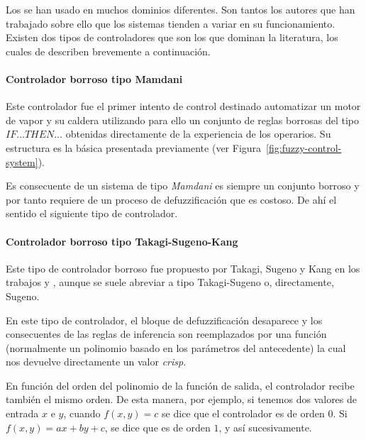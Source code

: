 Los  se han usado en muchos dominios diferentes. Son tantos los autores que han trabajado sobre ello que los sistemas tienden a variar en su funcionamiento. Existen dos tipos de controladores que son los que dominan la literatura, los cuales de describen brevemente a continuación.

\paragraph{Controlador borroso tipo Mamdani}

Este controlador fue el primer intento de control destinado automatizar un motor de vapor y su caldera utilizando para ello un conjunto de reglas borrosas del tipo \texttt{$IF \ldots THEN \ldots$} obtenidas directamente de la experiencia de los operarios. Su estructura es la básica presentada previamente (ver Figura~\ref{fig:fuzzy-control-system}).

Es consecuente de un sistema de tipo \textit{Mamdani} es siempre un conjunto borroso y por tanto requiere de un proceso de defuzzificación que es costoso. De ahí el sentido el siguiente tipo de controlador.

\paragraph{Controlador borroso tipo Takagi-Sugeno-Kang}

Este tipo de controlador borroso fue propuesto por Takagi, Sugeno y Kang en los trabajos \cite{takagi1993fuzzy} y \cite{sugeno1988structure}, aunque se suele abreviar a tipo Takagi-Sugeno o, directamente, Sugeno.

En este tipo de controlador, el bloque de defuzzificación desaparece y los consecuentes de las reglas de inferencia son reemplazados por una función (normalmente un polinomio basado en los parámetros del antecedente) la cual nos devuelve directamente un valor \textit{crisp}.

En función del orden del polinomio de la función de salida, el controlador recibe también el mismo orden. De esta manera, por ejemplo, si tenemos dos valores de entrada $x$ e $y$, cuando $f(x, y) = c$ se dice que el controlador es de orden $0$. Si $f(x, y) = ax + by + c$, se dice que es de orden $1$, y así sucesivamente.


